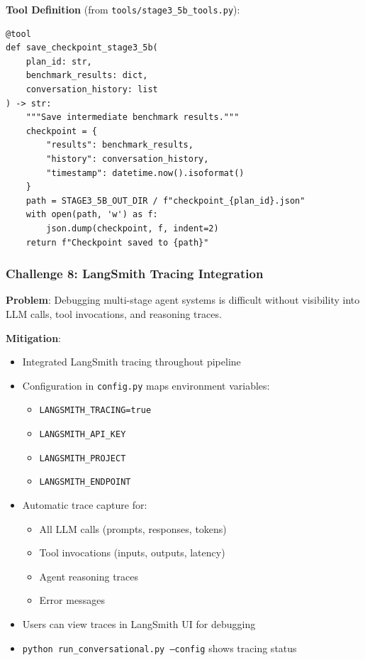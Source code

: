 \documentclass[11pt,a4paper]{article}
\begin{document}
\textbf{Tool Definition} (from \texttt{tools/stage3\_5b\_tools.py}):
\begin{verbatim}
@tool
def save_checkpoint_stage3_5b(
    plan_id: str,
    benchmark_results: dict,
    conversation_history: list
) -> str:
    """Save intermediate benchmark results."""
    checkpoint = {
        "results": benchmark_results,
        "history": conversation_history,
        "timestamp": datetime.now().isoformat()
    }
    path = STAGE3_5B_OUT_DIR / f"checkpoint_{plan_id}.json"
    with open(path, 'w') as f:
        json.dump(checkpoint, f, indent=2)
    return f"Checkpoint saved to {path}"
\end{verbatim}

\subsubsection{Challenge 8: LangSmith Tracing Integration}

\textbf{Problem}: Debugging multi-stage agent systems is difficult without visibility into LLM calls, tool invocations, and reasoning traces.

\textbf{Mitigation}:
\begin{itemize}
    \item Integrated LangSmith tracing throughout pipeline
    \item Configuration in \texttt{config.py} maps environment variables:
    \begin{itemize}
        \item \texttt{LANGSMITH\_TRACING=true}
        \item \texttt{LANGSMITH\_API\_KEY}
        \item \texttt{LANGSMITH\_PROJECT}
        \item \texttt{LANGSMITH\_ENDPOINT}
    \end{itemize}
    \item Automatic trace capture for:
    \begin{itemize}
        \item All LLM calls (prompts, responses, tokens)
        \item Tool invocations (inputs, outputs, latency)
        \item Agent reasoning traces
        \item Error messages
    \end{itemize}
    \item Users can view traces in LangSmith UI for debugging
    \item \texttt{python run\_conversational.py --config} shows tracing status
\end{itemize}
\end{document}
